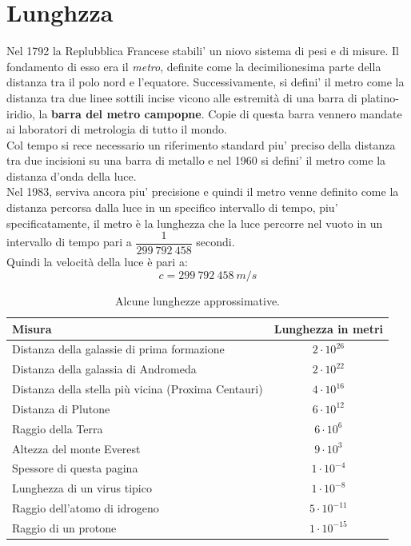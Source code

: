 \documentclass[12pt]{report}
\begin{document}
	\section{Lunghzza}
	Nel 1792 la Replubblica Francese stabili' un niovo sistema di pesi e di misure. Il fondamento di esso era il \textit{metro}, definite come la decimilionesima parte della distanza tra il polo nord e l'equatore. Successivamente, si defini' il metro come la distanza tra due linee sottili incise vicono alle estremità di una barra di platino-iridio, la \textbf{barra del metro campopne}. Copie di questa barra vennero mandate ai laboratori di metrologia di tutto il mondo. \\
	Col tempo si rece necessario un riferimento standard piu' preciso della distanza tra due incisioni su una barra di metallo e nel 1960 si defini' il metro come la distanza d'onda della luce. \\
	Nel 1983, serviva ancora piu' precisione e quindi il metro venne definito come la distanza percorsa dalla luce in un specifico intervallo di tempo, piu' specificatamente, il metro è  la lunghezza che la luce percorre nel vuoto in un intervallo di tempo pari a $\dfrac{1}{299\ 792\ 458}$ secondi. \\
	Quindi la velocità della luce è  pari a:
	\[
	c = 299\ 792\ 458\ m/s
	\]
	\begin{table}[H]
		\centering
		\caption{Alcune lunghezze approssimative.}
		\label{tab:lunghezze}
		\begin{tabular}{@{}l c@{}}
			\hline
			\textbf{Misura} & \textbf{Lunghezza in metri} \\
			\hline
			Distanza della galassie di prima formazione & $2 \cdot 10^{26}$ \\
			Distanza della galassia di Andromeda & $2 \cdot 10^{22}$ \\
			Distanza della stella più vicina (Proxima Centauri) & $4 \cdot 10^{16}$ \\
			Distanza di Plutone & $6 \cdot 10^{12}$ \\
			Raggio della Terra & $6 \cdot 10^{6}$ \\
			Altezza del monte Everest & $9 \cdot 10^{3}$ \\
			Spessore di questa pagina & $1 \cdot 10^{-4}$ \\
			Lunghezza di un virus tipico & $1 \cdot 10^{-8}$ \\
			Raggio dell'atomo di idrogeno & $5 \cdot 10^{-11}$ \\
			Raggio di un protone & $1 \cdot 10^{-15}$ \\
			\hline
		\end{tabular}
	\end{table}
\end{document}
